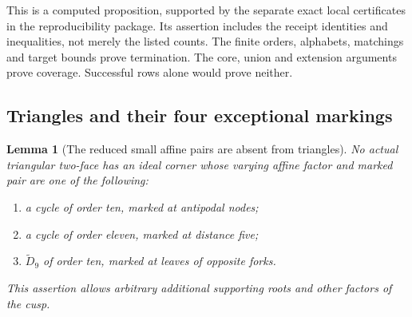 \documentclass[11pt]{article}
\newtheorem{lemma}[theorem]{Lemma}
\theoremstyle{remark}\newtheorem{remark}[theorem]{Remark}
\begin{document}
This is a computed proposition, supported by the separate exact
local certificates in the reproducibility package. Its assertion
includes the receipt identities and inequalities, not merely the
listed counts. The finite orders, alphabets, matchings and target
bounds prove termination. The core, union and extension arguments
prove coverage. Successful rows alone would prove neither.

\subsection{Triangles and their four exceptional markings}

\begin{lemma}[The reduced small affine pairs are absent from triangles]
\label{lem:current-affine-triangle-exclusions}
No actual triangular two-face has an ideal corner whose varying affine
factor and marked pair are one of the following:
\begin{enumerate}
\item a cycle of order ten, marked at antipodal nodes;
\item a cycle of order eleven, marked at distance five;
\item $\widetilde D_9$ of order ten, marked at leaves of opposite forks.
\end{enumerate}
This assertion allows arbitrary additional supporting roots and other
factors of the cusp.
\end{lemma}
\end{document}
